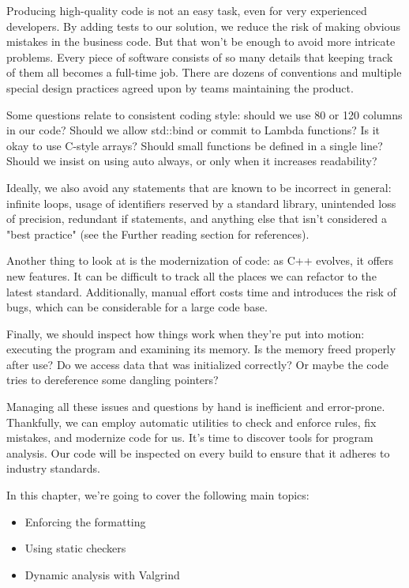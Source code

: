 Producing high-quality code is not an easy task, even for very experienced developers. By adding tests to our solution, we reduce the risk of making obvious mistakes in the business code. But that won't be enough to avoid more intricate problems. Every piece of software consists of so many details that keeping track of them all becomes a full-time job. There are dozens of conventions and multiple special design practices agreed upon by teams maintaining the product.

Some questions relate to consistent coding style: should we use 80 or 120 columns in our code? Should we allow std::bind or commit to Lambda functions? Is it okay to use C-style arrays? Should small functions be defined in a single line? Should we insist on using auto always, or only when it increases readability?

Ideally, we also avoid any statements that are known to be incorrect in general: infinite loops, usage of identifiers reserved by a standard library, unintended loss of precision, redundant if statements, and anything else that isn't considered a "best practice" (see the Further reading section for references).

Another thing to look at is the modernization of code: as C++ evolves, it offers new features. It can be difficult to track all the places we can refactor to the latest standard. Additionally, manual effort costs time and introduces the risk of bugs, which can be considerable for a large code base.

Finally, we should inspect how things work when they're put into motion: executing the program and examining its memory. Is the memory freed properly after use? Do we access data that was initialized correctly? Or maybe the code tries to dereference some dangling pointers?

Managing all these issues and questions by hand is inefficient and error-prone. Thankfully, we can employ automatic utilities to check and enforce rules, fix mistakes, and modernize code for us. It's time to discover tools for program analysis. Our code will be inspected on every build to ensure that it adheres to industry standards.

In this chapter, we're going to cover the following main topics:

\begin{itemize}
\item 
Enforcing the formatting

\item 
Using static checkers

\item 
Dynamic analysis with Valgrind
\end{itemize}













